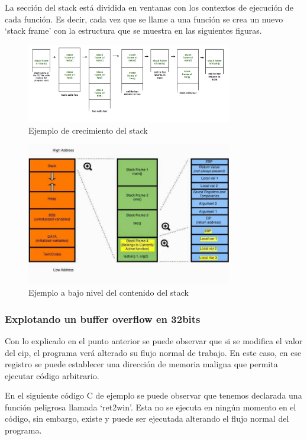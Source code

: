La sección del stack está dividida en ventanas con los contextos de ejecución de cada función. Es decir, cada vez que se llame a una función se crea un nuevo `stack frame' con la estructura que se muestra en las siguientes figuras.

\begin{figure}[htb!]
    \centering                        
    \includegraphics[width=0.8\textwidth]{images/stack-funcs.png}
    \caption{Ejemplo de crecimiento del stack}
    \label{fig:stack-funcs}
\end{figure}
\FloatBarrier
\begin{figure}[htb!]
    \centering                        
    \includegraphics[width=0.8\textwidth]{images/stack-arch.jpg}
    \caption{Ejemplo a bajo nivel del contenido del stack }
    \label{fig:stack-arch}
\end{figure}
\FloatBarrier
\subsubsection{Explotando un buffer overflow en 32bits}
Con lo explicado en el punto anterior se puede observar que si se modifica el valor del \acrshort{eip}, el programa verá alterado su flujo normal de trabajo. En este caso, en ese registro se puede establecer una dirección de memoria maligna que permita ejecutar código arbitrario.

En el siguiente código C de ejemplo se puede observar que tenemos declarada una función peligrosa llamada `ret2win'. Esta no se ejecuta en ningún momento en el código, sin embargo, existe y puede ser ejecutada alterando el flujo normal del programa.

